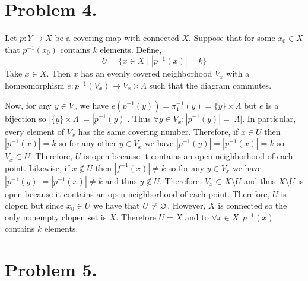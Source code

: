 \documentclass[12pt]{extarticle}
\theoremstyle{remark}
\begin{document}
\section*{Problem 4.}
Let $p : Y \to X$ be a covering map with connected $X$. Suppose that for some $x_0 \in X$ that $p^{-1}(x_0)$ contains $k$ elements. Define,
\[U = \{x \in X \mid |p^{-1}(x)| = k\}\]
Take $x \in X$. Then $x$ has an evenly covered neighborhood $V_x$ with a homeomorphism $e : p^{-1}(V_x) \to V_x \times \Lambda$ such that the diagram commutes.

\begin{center}
\end{center}
Now, for any $y \in V_x$ we have $e(p^{-1}(y)) = \pi_1^{-1}(y) = \{y\} \times \Lambda$ but $e$ is a bijection so $|\{y\} \times \Lambda| = |p^{-1}(y)|$. Thus $\forall y \in V_x : |p^{-1}(y)| = |\Lambda|$. In particular, every element of $V_x$ has the same covering number. Therefore, if $x \in U$ then $|p^{-1}(x)| = k$ so for any other $y \in V_x$ we have $|p^{-1}(y)| = |p^{-1}(x)| = k$ so $V_x \subset U$. Therefore, $U$ is open because it contains an open neighborhood of each point. Likewise, if $x \notin U$ then $|f^{-1}(x)| \neq k$ so for any $y \in V_x$ we have $|p^{-1}(y)| = |p^{-1}(x)| \neq k$ and thus $y \notin U$. Therefore, $V_x \subset X \setminus U$ and thus $X \setminus U$ is open because it contains an open neighborhood of each point. Therefore, $U$ is clopen but since $x_0 \in U$ we have that $U \neq \varnothing$. However, $X$ is connected so the only nonempty clopen set is $X$. Therefore $U = X$ and to $\forall x \in X : p^{-1}(x)$ contains $k$ elements.      

\section*{Problem 5.}
\end{document}
